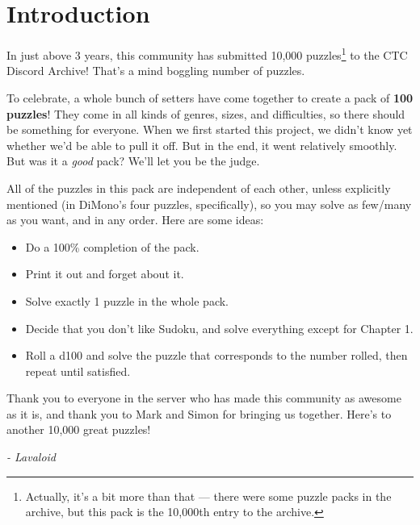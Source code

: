 \chapter{Introduction}

In just above 3 years, this community has submitted 10,000 puzzles\footnote{Actually, it's a bit 
more than that --- there were some puzzle packs in the archive, but this pack is the 10,000th entry 
to the archive.} to the CTC Discord Archive! That's a mind boggling number of puzzles. 

To celebrate, a whole bunch of setters have come together to create a pack of \textbf{100 puzzles}! 
They come in all kinds of genres, sizes, and difficulties, so there should be something for everyone.
When we first started this project, we didn't know yet whether we'd be able to pull it off. But in
the end, it went relatively smoothly. But was it a \emph{good} pack? We'll let you be the judge.


All of the puzzles in this pack are independent of each other, unless explicitly mentioned (in DiMono's
four puzzles, specifically), so you may solve as few/many as you want, and in any order. Here are some ideas:
\begin{itemize}
  \item Do a 100\% completion of the pack.
  \item Print it out and forget about it.
  \item Solve exactly 1 puzzle in the whole pack.
  \item Decide that you don't like Sudoku, and solve everything except for Chapter 1.
  \item Roll a d100 and solve the puzzle that corresponds to the number rolled, then repeat until satisfied.
\end{itemize}

Thank you to everyone in the server who has made this community as awesome as it is, and thank you to Mark 
and Simon for bringing us together. Here's to another 10,000 great puzzles!

\vspace{2em}

\hfill \emph{- Lavaloid}
